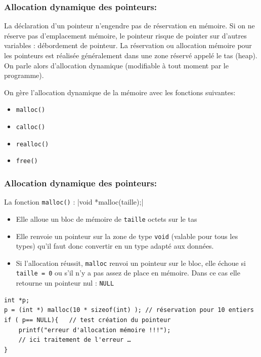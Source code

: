 \documentclass{beamer}
\begin{document}
\begin{frame}[fragile]
\frametitle{Allocation dynamique des pointeurs:}
La déclaration d'un pointeur n'engendre pas de réservation en mémoire. Si on ne réserve pas d'emplacement mémoire, le pointeur risque de pointer sur d'autres variables : débordement de pointeur. La réservation ou allocation mémoire pour les pointeurs est réalisée généralement dans une zone réservé appelé le tas (heap). On parle alors d'allocation dynamique (modifiable à tout moment par le programme).

On gère l'allocation dynamique de la mémoire avec les fonctions suivantes:
\begin{itemize}
\item {\tt malloc()}
\item {\tt calloc()}
\item {\tt realloc()}
\item {\tt free()}
\end{itemize}

\end{frame}


\begin{frame}[fragile]
\frametitle{Allocation dynamique des pointeurs:}
La fonction {\tt malloc()} : 
|void *malloc(taille);|
\begin{itemize}
\item Elle alloue un bloc de mémoire de {\tt taille} octets sur le tas
\item Elle renvoie un pointeur sur la zone de type {\tt void} (valable pour tous les types) qu'il faut donc convertir en un type adapté aux données.
\item Si l'allocation réussit, {\tt malloc} renvoi un pointeur sur le bloc, elle échoue si {\tt taille = 0} ou s'il n'y a pas assez de place en mémoire. Dans ce cas elle retourne un pointeur nul : {\tt NULL}
\end{itemize}
\begin{verbatim}
int *p;
p = (int *) malloc(10 * sizeof(int) ); // réservation pour 10 entiers
if ( p== NULL){   // test création du pointeur	
	printf("erreur d'allocation mémoire !!!");
	// ici traitement de l'erreur …
} 
\end{verbatim}
\end{frame}

\end{document}
